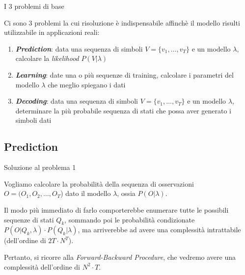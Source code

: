 \documentclass[hyperref={pdfpagelabels=false},slidestop,mathserif,red]{beamer}
\begin{document}
\begin{frame}{I 3 problemi di base}
 \begin{block}{}
  Ci sono 3 problemi la cui risoluzione \`e indispensabile affinch\`e il modello risulti utilizzabile in applicazioni reali:
	\begin{enumerate}
	 \item \textit{\textbf{Prediction}}: data una sequenza di simboli $V = \{v_{1}, \ldots, v_{T}\}$ e un modello $\lambda$, calcolare la \textit{likelihood} $P(V|\lambda)$
	 \item \textbf{\textit{Learning}}: date una o pi\`u sequenze di training, calcolare i parametri del modello $\lambda$ che meglio spiegano i dati
	 \item \textit{\textbf{Decoding}}: data una sequenza di simboli $V = \{v_{1}, \ldots, v_{T}\}$ e un modello $\lambda$, determinare la pi\`u probabile sequenza di stati che possa aver generato i simboli dati
	\end{enumerate}
 \end{block}
\end{frame}

\subsection{Prediction}

\begin{frame}{Soluzione al problema 1}
 \begin{block}{}
  Vogliamo calcolare la probabilit\`a della sequenza di osservazioni $O = (O_{1}, O_{2}, \ldots, O_{T}$) dato il modello $\lambda$, ossia $P(O|\lambda)$.
 \end{block}
\begin{block}{}
Il modo pi\`u immediato di farlo comporterebbe enumerare tutte le possibili sequenze di stati $Q_{k}$, sommando poi le probabilit\`a condizionate $P(O|Q_{k},\lambda) \cdot P(Q_{k}|\lambda)$, ma arriverebbe ad avere una complessit\`a intrattabile (dell'ordine di $2T \cdot N^{T}$).
 \end{block}
\begin{block}{}
Pertanto, si ricorre alla \textit{Forward-Backward Procedure}, che vedremo avere una complessit\`a dell'ordine di $N^2 \cdot T$.
 \end{block}

\end{frame}
\end{document}
